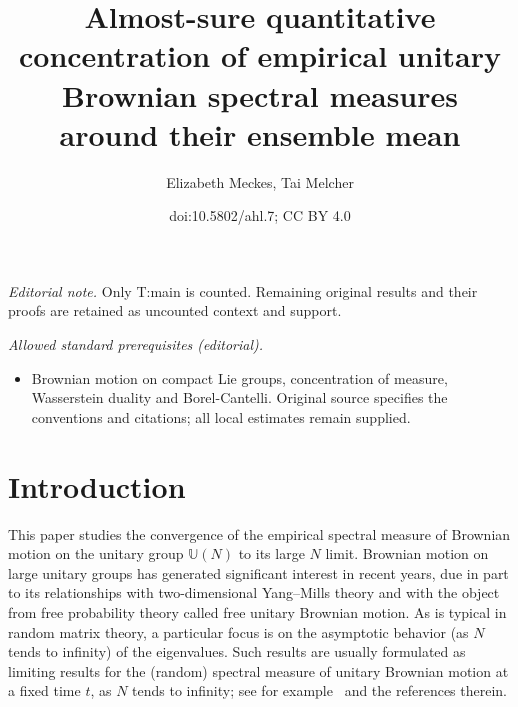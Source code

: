 \documentclass[11pt]{article}
\title{Almost-sure quantitative concentration of empirical unitary Brownian spectral measures around their ensemble mean}
\author{Elizabeth Meckes, Tai Melcher}
\date{doi:10.5802/ahl.7; CC BY 4.0}
\theoremstyle{definition}
\numberwithin{equation}{section}
\numberwithin{figure}{section}
\numberwithin{table}{section}
\newcommand{\Unitary}[1]{\mathbb{U}\left(#1\right)}
\begin{document}
\maketitle
\noindent\textit{Editorial note.} Only T:main is counted. Remaining original results and their proofs are retained as uncounted context and support.\par\medskip
\noindent\textit{Allowed standard prerequisites (editorial).}\begin{itemize}
\item Brownian motion on compact Lie groups, concentration of measure, Wasserstein duality and Borel-Cantelli. Original source specifies the conventions and citations; all local estimates remain supplied.
\end{itemize}\medskip
\section{Introduction}

This paper studies the convergence of the empirical spectral measure of Brownian motion on the unitary group $\Unitary{N}$ to its large $N$ limit. Brownian motion on large unitary groups has generated significant interest in recent years, due in part to its relationships with two-dimensional Yang--Mills theory and with the object from free probability theory called free unitary Brownian motion. As is typical in random matrix theory, a particular focus is on the asymptotic behavior (as $N$ tends to infinity) of the eigenvalues. Such results are usually formulated as limiting results for the (random) spectral measure of unitary Brownian motion at a fixed time $t$, as $N$ tends to infinity; see for example~\cite{Rains1997, Xu1997,Biane1997,Biane1997-2, Levy2008,LevyMaida2010,DHK2013, Kemp2015,CDK2016} and the references therein.
\end{document}
